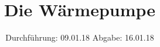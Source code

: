 

\subject{V206}
\title{Die Wärmepumpe}
\date{
  Durchführung: 09.01.18
  \hspace{3em}
  Abgabe: 16.01.18
}



\maketitle
\thispagestyle{empty}
\tableofcontents
\newpage








\newpage
\printbibliography


